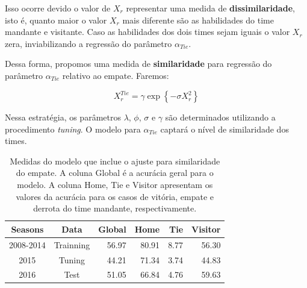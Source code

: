 \documentclass[doc,apacite,oneside,a4paper,12pt]{apa6}
\begin{document}
Isso ocorre devido o valor de $X_r$ representar uma medida de \textbf{dissimilaridade}, isto é, quanto maior o valor $X_r$ mais diferente são as habilidades do time mandante e visitante. Caso as habilidades dos dois times sejam iguais o valor  $X_r$ zera, inviabilizando a regressão do parâmetro $\alpha_{Tie}$. 

Dessa forma, propomos uma medida de \textbf{similaridade} para regressão do parâmetro $\alpha_{Tie}$ relativo ao empate. Faremos:

\begin{equation}
X_r^{Tie} = \gamma \exp{\left\{-\sigma X_r ^2\right\}}
\end{equation}

Nessa estratégia, os parâmetros $\lambda$, $\phi$, $\sigma$ e $\gamma$ são determinados utilizando a procedimento \textit{tuning}. O modelo para $\alpha_{Tie}$ captará o nível de similaridade dos times.


\begin{table}[ht]
\centering
\begin{tabular}{cc|r|rrr}
  \hline
Seasons & Data & \textbf{Global} & Home & Tie & Visitor \\ 
  \hline
2008-2014 & Trainning & 56.97 & 80.91 & 8.77 & 56.30 \\ 
  2015 & Tuning & 44.21 & 71.34 & 3.74 & 44.83 \\ 
  2016 & Test & 51.05 & 66.84 & 4.76 & 59.63 \\ 
   \hline
\end{tabular}
    \caption[\scriptsize{Medidas do modelo com similaridade para o empate.}]{\scriptsize{Medidas do modelo que inclue o ajuste para similaridade do empate. A coluna Global é a acurácia geral para o modelo. A coluna Home, Tie e Visitor apresentam os valores da acurácia para os casos de vitória, empate e derrota do time mandante, respectivamente. }}
    \label{tab:medidasmodsi}
\end{table}	
\end{document}
